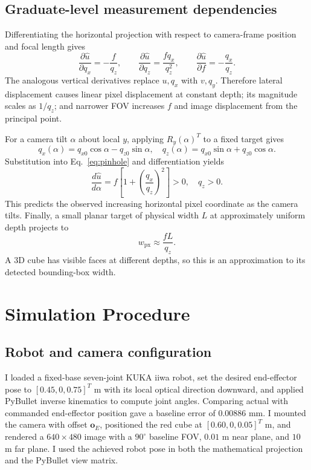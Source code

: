 \documentclass[11pt,letterpaper]{article}
\begin{document}
\subsection{Graduate-level measurement dependencies}
Differentiating the horizontal projection with respect to camera-frame position and focal length gives
\begin{equation}
\frac{\partial\hat u}{\partial q_x}=-\frac{f}{q_z},\qquad
\frac{\partial\hat u}{\partial q_z}=\frac{fq_x}{q_z^2},\qquad
\frac{\partial\hat u}{\partial f}=-\frac{q_x}{q_z}.\label{eq:partialsx}
\end{equation}
The analogous vertical derivatives replace $u,q_x$ with $v,q_y$. Therefore lateral displacement causes linear pixel displacement at constant depth; its magnitude scales as $1/q_z$; and narrower FOV increases $f$ and image displacement from the principal point.

For a camera tilt $\alpha$ about local $y$, applying $R_y(\alpha)^T$ to a fixed target gives
\begin{equation}
q_x(\alpha)=q_{x0}\cos\alpha-q_{z0}\sin\alpha,\quad
q_z(\alpha)=q_{x0}\sin\alpha+q_{z0}\cos\alpha.\label{eq:tiltcoords}
\end{equation}
Substitution into Eq.~\eqref{eq:pinhole} and differentiation yields
\begin{equation}
\frac{d\hat u}{d\alpha}=f\!\left[1+\left(\frac{q_x}{q_z}\right)^2\right]>0,\quad q_z>0.\label{eq:tiltsens}
\end{equation}
This predicts the observed increasing horizontal pixel coordinate as the camera tilts. Finally, a small planar target of physical width $L$ at approximately uniform depth projects to
\begin{equation}
w_{\mathrm{px}}\approx\frac{fL}{q_z}.\label{eq:size}
\end{equation}
A 3D cube has visible faces at different depths, so this is an approximation to its detected bounding-box width.


\section{Simulation Procedure}
\subsection{Robot and camera configuration}
I loaded a fixed-base seven-joint KUKA iiwa robot, set the desired end-effector pose to $[0.45,0,0.75]^T$ m with its local optical direction downward, and applied PyBullet inverse kinematics to compute joint angles. Comparing actual with commanded end-effector position gave a baseline error of $0.00886$ mm. I mounted the camera with offset $\mathbf{o}_E$, positioned the red cube at $[0.60,0,0.05]^T$ m, and rendered a $640\times480$ image with a $90^\circ$ baseline FOV, $0.01$ m near plane, and $10$ m far plane. I used the achieved robot pose in both the mathematical projection and the PyBullet view matrix.
\end{document}
